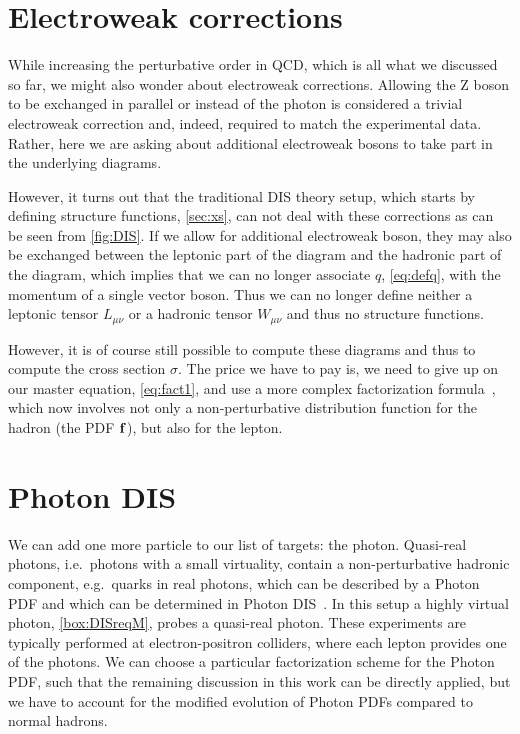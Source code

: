 \section{Electroweak corrections}
While increasing the perturbative order in QCD, which is all what we discussed so far, we might also wonder about electroweak corrections.
Allowing the Z boson to be exchanged in parallel or instead of the photon is considered a trivial electroweak correction and, indeed, required to match the experimental data.
Rather, here we are asking about additional electroweak bosons to take part in the underlying diagrams.

However, it turns out that the traditional DIS theory setup, which starts by defining structure functions, \cref{sec:xs}, can not deal with these corrections as can be seen from \cref{fig:DIS}.
If we allow for additional electroweak boson, they may also be exchanged between the leptonic part of the diagram and the hadronic part of the diagram, which implies that we can no longer associate $q$, \cref{eq:defq}, with the momentum of a single vector boson.
Thus we can no longer define neither a leptonic tensor $L_{\mu\nu}$ or a hadronic tensor $W_{\mu\nu}$ and thus no structure functions.

However, it is of course still possible to compute these diagrams and thus to compute the cross section $\sigma$.
The price we have to pay is, we need to give up on our master equation, \cref{eq:fact1}, and use a more complex factorization formula~\cite{Liu:2020rvc,Liu:2021jfp,Qiu:2026fed}, which now involves not only a non-perturbative distribution function for the hadron (the PDF $\vb f$), but also for the lepton.

\section{Photon DIS}
We can add one more particle to our list of targets: the photon.
Quasi-real photons, i.e.\ photons with a small virtuality, contain a non-perturbative hadronic component, e.g.\ quarks in real photons, which can be described by a Photon PDF and which can be determined in Photon DIS~\cite{Chithirasreemadam:2026mqp}.
In this setup a highly virtual photon, \cref{box:DISreqM}, probes a quasi-real photon.
These experiments are typically performed at electron-positron colliders, where each lepton provides one of the photons.
We can choose a particular factorization scheme for the Photon PDF, such that the remaining discussion in this work can be directly applied, but we have to account for the modified evolution of Photon PDFs compared to normal hadrons.

~

